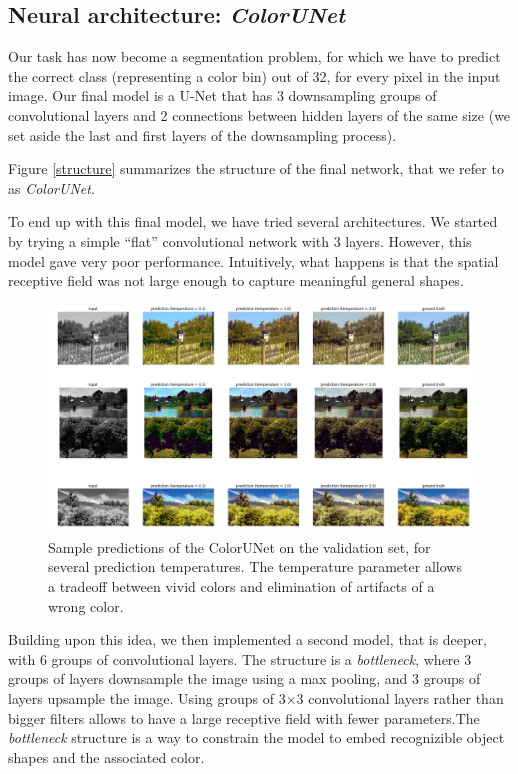 \documentclass[10pt,twocolumn,letterpaper]{article}
\begin{document}
\subsection{Neural architecture: \textit{ColorUNet}}

Our task has now become a segmentation problem, for which we have to predict the correct class (representing a color bin) out of 32, for every pixel in the input image. Our final model is a U-Net that has 3 downsampling groups of convolutional layers and 2 connections between hidden layers of the same size (we set aside the last and first layers of the downsampling process).

Figure \ref{structure} summarizes the structure of the final network, that we refer to as \textit{ColorUNet}.

To end up with this final model, we have tried several architectures. We started by trying a simple ``flat'' convolutional network with 3 layers. However, this model gave very poor performance. Intuitively, what happens is that the spatial receptive field was not large enough to capture meaningful general shapes.
\begin{figure}
\begin{center}
\includegraphics[width=450px]{good}
\caption{Sample predictions of the ColorUNet on the validation set, for several prediction temperatures. The temperature parameter allows a tradeoff between vivid colors and elimination of artifacts of a wrong color.}
\label{good}
\end{center}
\end{figure}
Building upon this idea, we then implemented a second model, that is deeper, with 6 groups of convolutional layers. The structure is a \textit{bottleneck}, where 3 groups of layers downsample the image using a max pooling, and 3 groups of layers upsample the image. Using groups of 3$\times$3 convolutional layers rather than bigger filters allows to have a large receptive field with fewer parameters.The \textit{bottleneck} structure is a way to constrain the model to embed recognizible object shapes and the associated color. 
\end{document}
